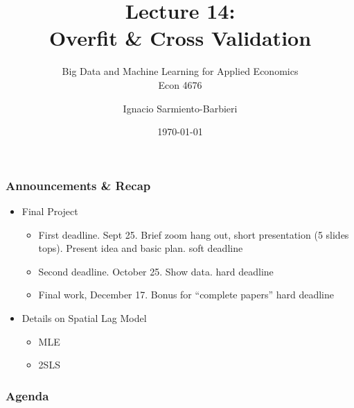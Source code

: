 \documentclass[
  shownotes,
  xcolor={svgnames},
  hyperref={colorlinks,citecolor=DarkBlue,linkcolor=DarkRed,urlcolor=DarkBlue}
  ]{beamer}
\begin{document}
\title[Lecture 14]{Lecture 14: \\ Overfit \& Cross Validation}
\subtitle{Big Data and Machine Learning for Applied Economics \\ Econ 4676}
\date{\today}

\author[Sarmiento-Barbieri]{Ignacio Sarmiento-Barbieri}


\begin{frame}[noframenumbering]
\maketitle
\end{frame}


\begin{frame}
\frametitle{Announcements \& Recap}

\begin{itemize}
  \item Final Project
  \medskip
  \begin{itemize}
    \item First deadline. Sept 25.  Brief zoom hang out, short presentation (5 slides tops). Present idea and basic plan. \textcolor{airforceblue}{soft deadline}
     \medskip
    \item  Second deadline. October 25. Show data. \textcolor{andesred}{hard deadline}
      \medskip
    \item  Final work, December 17. Bonus for ``complete papers'' \textcolor{andesred}{hard deadline}
  \end{itemize}
\bigskip   
  \item Details on Spatial Lag Model
  \medskip
      \begin{itemize} 
        \item MLE
            \medskip
        \item 2SLS
      \end{itemize}
\end{itemize}

\end{frame}


\begin{frame}
\frametitle{Agenda}

\tableofcontents

\end{frame}
\end{document}
